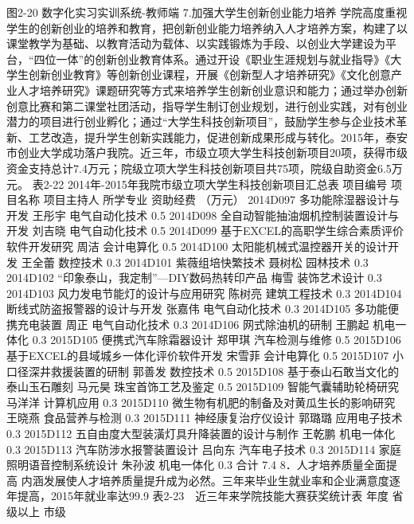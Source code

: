 图2-20 数字化实习实训系统-教师端
7.加强大学生创新创业能力培养
学院高度重视学生的创新创业的培养和教育，把创新创业能力培养纳入人才培养方案，构建了以课堂教学为基础、以教育活动为载体、以实践锻炼为手段、以创业大学建设为平台，“四位一体”的创新创业教育体系。通过开设《职业生涯规划与就业指导》《大学生创新创业教育》等创新创业课程，开展《创新型人才培养研究》《文化创意产业人才培养研究》课题研究等方式来培养学生创新创业意识和能力；通过举办创新创意比赛和第二课堂社团活动，指导学生制订创业规划，进行创业实践，对有创业潜力的项目进行创业孵化；通过“大学生科技创新项目”，鼓励学生参与企业技术革新、工艺改造，提升学生创新实践能力，促进创新成果形成与转化。2015年，泰安市创业大学成功落户我院。近三年，市级立项大学生科技创新项目20项，获得市级资金支持总计7.4万元；院级立项大学生科技创新项目共75项，院级自助资金6.5万元。
表2-22 2014年-2015年我院市级立项大学生科技创新项目汇总表
项目编号
项目名称
项目主持人
所学专业
资助经费
（万元）
2014D097
多功能除湿器设计与开发
王彤宇
电气自动化技术
0.5
2014D098
全自动智能抽油烟机控制装置设计与开发
刘吉晓
电气自动化技术
0.5
2014D099
基于EXCEL的高职学生综合素质评价软件开发研究
周洁
会计电算化
0.5
2014D100
太阳能机械式温控器开关的设计开发
王全蕾
数控技术
0.3
2014D101
紫薇组培快繁技术
聂树松
园林技术
0.3
2014D102
“印象泰山，我定制”—DIY数码热转印产品
梅雪
装饰艺术设计
0.3
2014D103
风力发电节能灯的设计与应用研究
陈树亮
建筑工程技术
0.3
2014D104
断线式防盗报警器的设计与开发
张嘉伟
电气自动化技术
0.3
2014D105
多功能便携充电装置
周正
电气自动化技术
0.3
2014D106
网式除油机的研制
王鹏起
机电一体化
0.3
2015D105
便携式汽车除霜器设计
郑甲琪
汽车检测与维修
0.5
2015D106
基于EXCEL的县域城乡一体化评价软件开发
宋雪菲
 会计电算化
0.5
2015D107
小口径深井救援装置的研制
郭善发
数控技术
0.5
2015D108
基于泰山石敢当文化的泰山玉石雕刻
马元昊
 珠宝首饰工艺及鉴定
0.5
2015D109
智能气囊辅助轮椅研究
马洋洋
计算机应用
0.3
2015D110
微生物有机肥的制备及对黄瓜生长的影响研究
王晓燕
食品营养与检测
0.3
2015D111
神经康复治疗仪设计
郭璐璐
应用电子技术
0.3
2015D112
五自由度大型装潢灯具升降装置的设计与制作
王乾鹏
机电一体化
0.3
2015D113
汽车防涉水报警装置设计
吕向东
汽车电子技术
0.3
2015D114
家庭照明语音控制系统设计
朱孙波
机电一体化
0.3
合计
7.4
8．人才培养质量全面提高
内涵发展使人才培养质量提升成为必然。三年来毕业生就业率和企业满意度逐年提高，2015年就业率达99.9%
表2-23　近三年来学院技能大赛获奖统计表
年度
省级以上
市级

